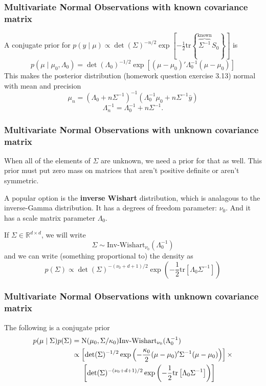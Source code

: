\documentclass{beamer}
\begin{document}
\begin{frame}[fragile]
\frametitle{Multivariate Normal Observations with known covariance matrix}

A conjugate prior for $p(y \mid \mu) \propto \det(\Sigma)^{-n/2} \exp\left[-\frac{1}{2} \text{tr}\left\{\overbrace{\Sigma^{-1}}^{ \text{known} } S_0 \right\} \right]$ is
$$
p(\mu \mid \mu_0, \Lambda_0) = \det(\Lambda_0)^{-1/2} \exp\left[(\mu - \mu_0)'\Lambda_0^{-1}(\mu - \mu_0) \right]
$$
This makes the posterior distribution (homework question exercise 3.13) normal with mean and precision
\[
\mu_n  = (\Lambda_0 + n \Sigma^{-1})^{-1}(\Lambda_0^{-1} \mu_0 + n \Sigma^{-1} \bar{y})
\]
\[
\Lambda_n^{-1} = \Lambda_0^{-1} + n \Sigma^{-1}.
\]
\end{frame}

\begin{frame}[fragile]
\frametitle{Multivariate Normal Observations with unknown covariance matrix}

When all of the elements of $\Sigma$ are unknown, we need a prior for that as well. This prior must put zero mass on matrices that aren't positive definite or aren't symmetric. 
\newline

A popular option is the {\bf inverse Wishart} distribution, which is analagous to the inverse-Gamma distribution. It has a degrees of freedom parameter: $\nu_0$. And it has a scale matrix parameter $\Lambda_0$. 
\newline
\pause

If $\Sigma \in \mathbb{R}^{d \times d}$, we will write
$$
\Sigma \sim \text{Inv-Wishart}_{\nu_0}(\Lambda_0^{-1})
$$
and we can write (something proportional to) the density as 
$$
p(\Sigma) \propto \det(\Sigma)^{-(\nu_0 + d + 1)/2}\exp\left( -\frac{1}{2} \text{tr}\left[\Lambda_0 \Sigma^{-1} \right] \right)
$$

\end{frame}

\begin{frame}[fragile]
\frametitle{Multivariate Normal Observations with unknown covariance matrix}

The following is a conjugate prior
\begin{align*}
p(\mu \mid \Sigma)p(\Sigma) &= \text{N}(\mu_0, \Sigma / \kappa_0)\text{Inv-Wishart}_{\nu_0}(\Lambda_0^{-1}) \\
&\propto \left[\det(\Sigma)^{-1/2}\exp\left(-\frac{\kappa_0}{2}(\mu - \mu_0)'\Sigma^{-1}(\mu - \mu_0) \right) \right] \times \\
& \hspace{5mm} \left[   \det(\Sigma)^{-(\nu_0 + d + 1)/2}\exp\left( -\frac{1}{2} \text{tr}\left[\Lambda_0 \Sigma^{-1} \right] \right) \right]
\end{align*}

\end{frame}
\end{document}
